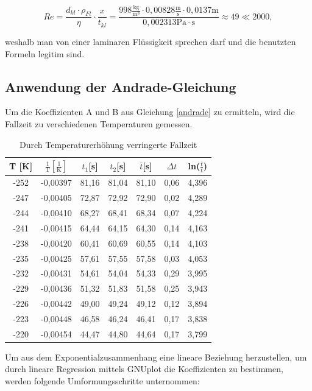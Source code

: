 \begin{equation}
 Re = \frac{d_{kl}\cdot \rho_{Fl}}{\eta} \cdot \frac{x}{t_{kl}}=\frac{998\frac{\text{kg}}{\text{m}^3} \cdot 0,00828\frac{\text{m}}{\text{s}} \cdot 0,0137 \text{m}}{0,002313 \text{Pa}\cdot\text{s}} \approx 49 \ll 2000,
\end{equation}

weshalb man von einer laminaren Flüssigkeit sprechen darf und die benutzten Formeln legitim sind.

\subsection{Anwendung der Andrade-Gleichung}
Um die Koeffizienten A und B aus Gleichung \eqref{andrade} zu ermitteln, wird die Fallzeit zu verschiedenen Temperaturen gemessen.

\renewcommand{\arraystretch}{1.2}
\begin{table}[H]
 \begin{tabular}{c|c|c|c|c|c|c}
   T [K] & $\frac{1}{\text{T}}[\frac{1}{\text{K}}]$& $t_1$[s] & $t_2$[s] & $\bar t$[s] & $\Delta t$ & ln($\frac{\bar t}{t}$)\\	
   \hline
-252&	-0,00397&	81,16&	81,04&	81,10&	0,06&	4,396 \\
-247&	-0,00405&	72,87&	72,92&	72,90&	0,02&	4,289\\
-244&	-0,00410&	68,27&	68,41&	68,34&	0,07&	4,224\\
-241&	-0,00415&	64,44&	64,15&	64,30&	0,14&	4,163\\
-238&	-0,00420&	60,41&	60,69&	60,55&	0,14&	4,103\\
-235&	-0,00425&	57,61&	57,55&	57,58&	0,03&	4,053\\
-232&	-0,00431&	54,61&	54,04&	54,33&	0,29&	3,995\\
-229&	-0,00436&	51,32&	51,83&	51,58&	0,25&	3,943\\
-226&	-0,00442&	49,00&	49,24&	49,12&	0,12&	3,894\\
-223&	-0,00448&	46,58&	46,24&	46,41&	0,17&	3,838\\
-220&	-0,00454&	44,47&	44,80&	44,64&	0,17&	3,799\\
 \end{tabular}
\caption{Durch Temperaturerhöhung verringerte Fallzeit}
\end{table}
\renewcommand{\arraystretch}{1}

Um aus dem Exponentialzusammenhang eine lineare Beziehung herzustellen, um durch lineare Regression mittels GNUplot
die Koeffizienten zu bestimmen,
werden folgende Umformungsschritte unternommen:

